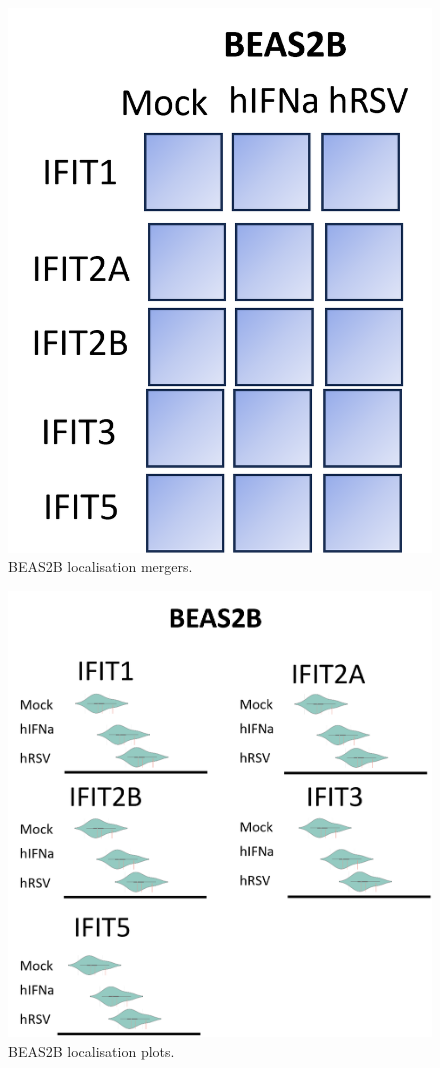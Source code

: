 \begin{figure}
    \centering
    \includegraphics[width=0.7\linewidth]{09. Chapter 4/Figs/01. Localisation introduction/05. beas2b merges.png}
    \caption[BEAS2B localisation mergers.]{BEAS2B localisation mergers.}
    \label{fig:BEAS2B localisation mergers.}
\end{figure}


\begin{figure}
    \centering
    \includegraphics[width=1\linewidth]{09. Chapter 4/Figs/01. Localisation introduction/06. beas2b plots.png}
    \caption[BEAS2B localisation plots.]{BEAS2B localisation plots.}
    \label{fig:BEAS2B localisation plots.}
\end{figure}



